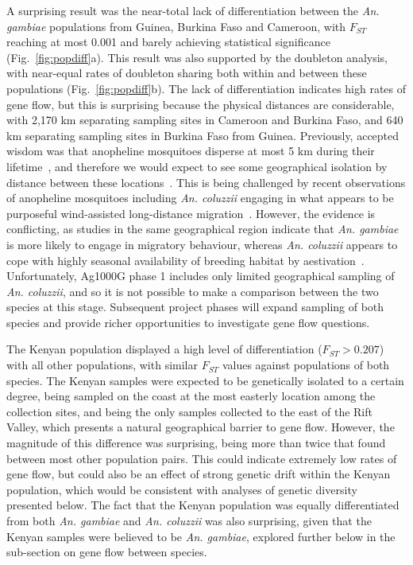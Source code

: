 \begin{refsection}
A surprising result was the near-total lack of differentiation between the \textit{An. gambiae} populations from Guinea, Burkina Faso and Cameroon, with $F_{ST}$ reaching at most 0.001 and barely achieving statistical significance (Fig.~\ref{fig:popdiff}a).
%
This result was also supported by the doubleton analysis, with near-equal rates of doubleton sharing both within and between these populations (Fig.~\ref{fig:popdiff}b).
%
The lack of differentiation indicates high rates of gene flow, but this is surprising because the physical distances are considerable, with 2,170 km separating sampling sites in Cameroon and Burkina Faso, and 640 km separating sampling sites in Burkina Faso from Guinea.
%
Previously, accepted wisdom was that anopheline mosquitoes disperse at most 5 km during their lifetime~\parencite{Service1997}, and therefore we would expect to see some geographical isolation by distance between these locations~\parencite{Rousset1997}.
%
This is being challenged by recent observations of anopheline mosquitoes including \textit{An. coluzzii} engaging in what appears to be purposeful wind-assisted long-distance migration~\parencite{Huestis2019}.
%
However, the evidence is conflicting, as studies in the same geographical region indicate that \textit{An. gambiae} is more likely to engage in migratory behaviour, whereas \textit{An. coluzzii} appears to cope with highly seasonal availability of breeding habitat by aestivation~\parencite{Dao2014}.
%
Unfortunately, Ag1000G phase 1 includes only limited geographical sampling of \textit{An. coluzzii}, and so it is not possible to make a comparison between the two species at this stage.
%
Subsequent project phases will expand sampling of both species and provide richer opportunities to investigate gene flow questions.


The Kenyan population displayed a high level of differentiation ($F_{ST} > 0.207$) with all other populations, with similar $F_{ST}$ values against populations of both species.
%
The Kenyan samples were expected to be genetically isolated to a certain degree, being sampled on the coast at the most easterly location among the collection sites, and being the only samples collected to the east of the Rift Valley, which presents a natural geographical barrier to gene flow.
%
However, the magnitude of this difference was surprising, being more than twice that found between most other population pairs.
%
This could indicate extremely low rates of gene flow, but could also be an effect of strong genetic drift within the Kenyan population, which would be consistent with analyses of genetic diversity presented below.
%
The fact that the Kenyan population was equally differentiated from both \textit{An. gambiae} and \textit{An. coluzzii} was also surprising, given that the Kenyan samples were believed to be \textit{An. gambiae}, explored further below in the sub-section on gene flow between species.



\end{refsection}
